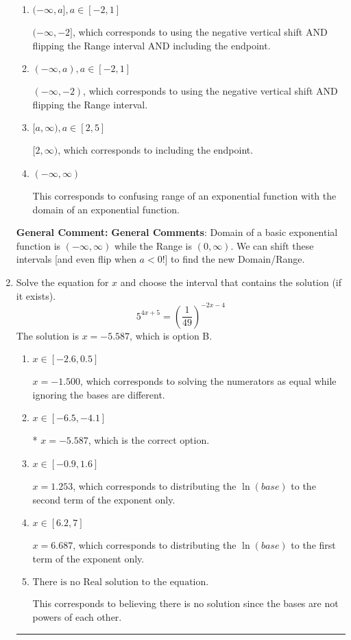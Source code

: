 \documentclass{extbook}[14pt]
\newcommand{\litem}[1]{\item #1

\rule{\textwidth}{0.4pt}}
\begin{document}
\begin{enumerate}
{\begin{enumerate}[label=\Alph*.]
* $(2, \infty)$, which is the correct option.
\item \( (-\infty, a], a \in [-2, 1] \)

$(-\infty, -2]$, which corresponds to using the negative vertical shift AND flipping the Range interval AND including the endpoint.
\item \( (-\infty, a), a \in [-2, 1] \)

$(-\infty, -2)$, which corresponds to using the negative vertical shift AND flipping the Range interval.
\item \( [a, \infty), a \in [2, 5] \)

$[2, \infty)$, which corresponds to including the endpoint.
\item \( (-\infty, \infty) \)

This corresponds to confusing range of an exponential function with the domain of an exponential function.
\end{enumerate}

\textbf{General Comment:} \textbf{General Comments}: Domain of a basic exponential function is $(-\infty, \infty)$ while the Range is $(0, \infty)$. We can shift these intervals [and even flip when $a<0$!] to find the new Domain/Range.
}
\litem{
Solve the equation for $x$ and choose the interval that contains the solution (if it exists).
\[ 5^{4x+5} = \left(\frac{1}{49}\right)^{-2x-4} \]The solution is \( x = -5.587 \), which is option B.\begin{enumerate}[label=\Alph*.]
\item \( x \in [-2.6, 0.5] \)

$x = -1.500$, which corresponds to solving the numerators as equal while ignoring the bases are different.
\item \( x \in [-6.5, -4.1] \)

* $x = -5.587$, which is the correct option.
\item \( x \in [-0.9, 1.6] \)

$x = 1.253$, which corresponds to distributing the $\ln(base)$ to the second term of the exponent only.
\item \( x \in [6.2, 7] \)

$x = 6.687$, which corresponds to distributing the $\ln(base)$ to the first term of the exponent only.
\item \( \text{There is no Real solution to the equation.} \)

This corresponds to believing there is no solution since the bases are not powers of each other.
\end{enumerate}

}
\end{enumerate}
\end{document}
